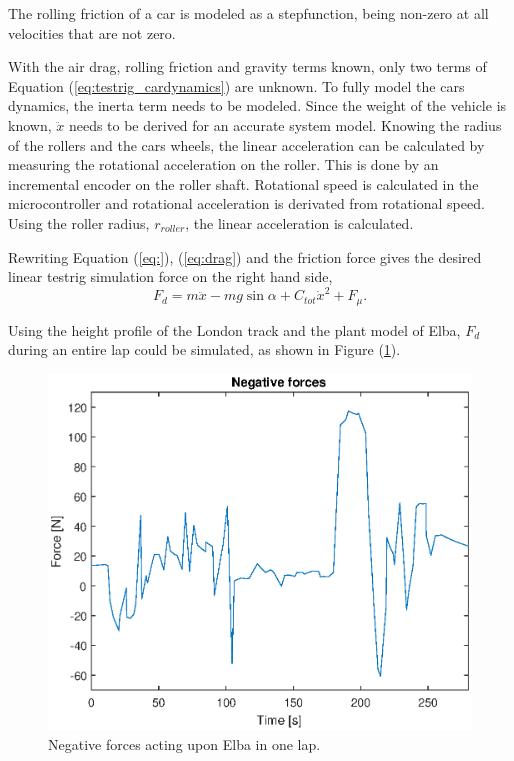 The rolling friction of a car is modeled as a stepfunction, being non-zero at
all velocities that are not zero.

With the air drag, rolling friction and gravity terms known, only two terms of
Equation (\ref{eq:testrig_cardynamics}) are unknown. To fully model the cars
dynamics, the inerta term needs to be modeled. Since the weight of the vehicle
is known, $\ddot{x}$ needs to be derived for an accurate system model.
Knowing the radius of the rollers and the cars wheels, the linear acceleration
can be calculated by measuring the rotational acceleration on the roller. This
is done by an incremental encoder on the roller shaft. Rotational speed is
calculated in the microcontroller and rotational acceleration is derivated from
rotational speed. Using the roller radius, $r_{roller}$, the linear acceleration
is calculated.

Rewriting Equation (\ref{eq:}), (\ref{eq:drag}) and the friction force gives the
desired linear testrig simulation force on the right hand side,
\begin{equation} \label{eq:simulationforce}
    F_d = m\ddot{x} - mg\sin{\alpha} + C_{tot}\dot{x}^2 + F_{\mu}.
\end{equation}

Using the height profile of the London track and the plant model of Elba, $F_d$ during an entire lap could be simulated, as shown in Figure (\ref{fig:testrig_negative_forces}).

\begin{figure}[H]
    \label{fig:testrig_negative_forces}
    \centering
    \includegraphics[width=\textwidth]{./img/testrig_negative_forces.eps}
    \caption{Negative forces acting upon Elba in one lap.}
\end{figure}

